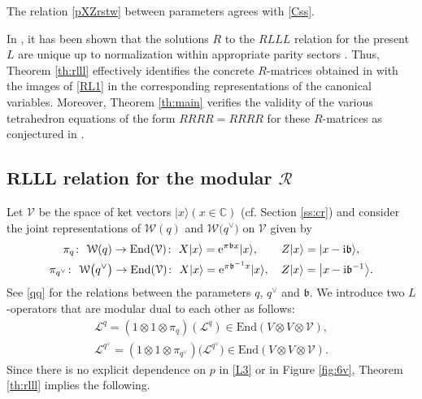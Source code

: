 \documentclass[pdftex]{sigma}
\newcommand{\C}{{\mathbb C}}
\newcommand{\bb}{{\mathfrak b}}
\newcommand{\e}{{\mathrm e}}
\numberwithin{equation}{section}
\begin{document}
The relation \eqref{pXZrstw} between parameters agrees with \eqref{Css}.


In \cite{KMY23}, it has been shown that
the solutions $R$ to the $RLLL$ relation for the present $L$
are unique up to normalization within appropriate parity sectors \cite{KMY23}.
Thus, Theorem \ref{th:rlll} effectively identifies the concrete $R$-matrices obtained in \cite{KMY23}
with the images of \eqref{RL1} in the corresponding representations of the canonical variables.
Moreover, Theorem \ref{th:main} verifies the validity of the various tetrahedron equations
of the form $RRRR=RRRR$ for these $R$-matrices as conjectured in \cite[Section~6.2]{KMY23}.


\subsection[RLLL relation for the modular R]{$\boldsymbol{RLLL}$ relation for the modular $\boldsymbol{\mathcal{R}}$}

Let $\mathcal{V}$ be the space of ket vectors $|x\rangle (x \in \C)$
(cf. Section \ref{ss:cr}) and
consider the joint representations of $\mathcal{W}(q)$ and
$\mathcal{W}\bigl({q^\vee}\bigr)$ on $\mathcal{V}$ given by
\begin{gather*}%
\pi_q\colon\ \mathcal{W}(q) \rightarrow \mathrm{End}(\mathcal{V})\colon\
 X|x\rangle = \e^{\pi \bb x}|x\rangle, \qquad Z|x\rangle = |x-{\rm i}\bb\rangle,
\\
\pi_{q^\vee}\colon\ \mathcal{W}\bigl({q^\vee}\bigr) \rightarrow \mathrm{End}(\mathcal{V})\colon\
 X|x\rangle = \e^{\pi \bb^{-1} x}|x\rangle, \quad Z|x\rangle = \bigl|x-{\rm i}\bb^{-1}\bigr\rangle.
\end{gather*}
See \eqref{qq} for the relations between the parameters $q$, $q^\vee$
and $\bb$. We introduce two $L$-operators that are modular dual to
each other as follows:
\begin{gather*}%
\mathcal{L}^q = (1 \otimes 1 \otimes \pi_q)(\mathscr{L}^q) \in \mathrm{End}(V \otimes V \otimes \mathcal{V}),
\\
\mathcal{L}^{q^\vee} =(1 \otimes 1 \otimes \pi_{q^\vee})
\bigl(\mathscr{L}^{q^\vee}\bigr) \in \mathrm{End}(V \otimes V \otimes \mathcal{V}).
\end{gather*}
Since there is no explicit dependence on $p$ in \eqref{L3} or in Figure \ref{fig:6v},
Theorem \ref{th:rlll} implies the following.
\end{document}
